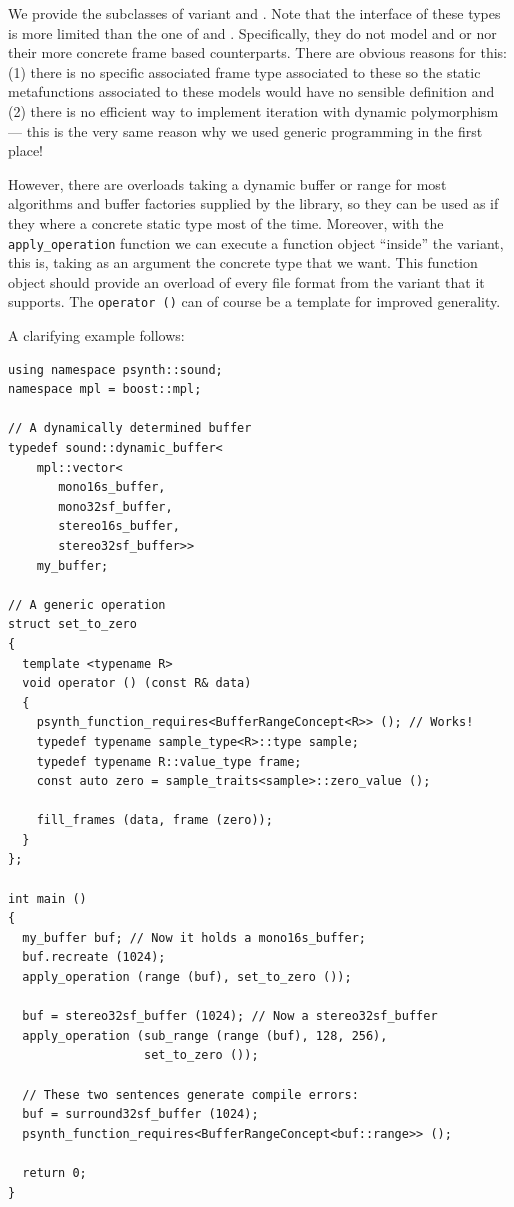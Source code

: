 We provide the subclasses of variant  and
. Note that the interface of these types
is more limited than the one of  and
. Specifically, they do not model
 and  or nor
their more concrete frame based counterparts. There
are obvious reasons for this: (1) there is no specific associated
frame type associated to these so the static metafunctions associated
to these models would have no sensible definition and (2) there is no
efficient way to implement iteration with dynamic polymorphism ---
this is the very same reason why we used generic programming in the
first place!

However, there are overloads taking a dynamic buffer or range for most
algorithms and buffer factories supplied by the library, so they can
be used as if they where a concrete static type most of the
time. Moreover, with the \texttt{apply\_operation} function we can
execute a function object ``inside'' the variant, this is, taking as
an argument the concrete type that we want. This function object
should provide an  overload of every file format from
the variant that it supports. The \texttt{operator ()} can of course
be a template for improved generality.

A clarifying example follows:

\begin{lstlisting}
using namespace psynth::sound;
namespace mpl = boost::mpl;

// A dynamically determined buffer
typedef sound::dynamic_buffer<
    mpl::vector<
       mono16s_buffer,
       mono32sf_buffer,
       stereo16s_buffer,
       stereo32sf_buffer>>
    my_buffer;

// A generic operation
struct set_to_zero
{
  template <typename R>
  void operator () (const R& data)
  {
    psynth_function_requires<BufferRangeConcept<R>> (); // Works!
    typedef typename sample_type<R>::type sample;
    typedef typename R::value_type frame;
    const auto zero = sample_traits<sample>::zero_value ();
  
    fill_frames (data, frame (zero));
  }
};

int main ()
{
  my_buffer buf; // Now it holds a mono16s_buffer;
  buf.recreate (1024);
  apply_operation (range (buf), set_to_zero ());
  
  buf = stereo32sf_buffer (1024); // Now a stereo32sf_buffer
  apply_operation (sub_range (range (buf), 128, 256), 
                   set_to_zero ());
  
  // These two sentences generate compile errors:
  buf = surround32sf_buffer (1024);
  psynth_function_requires<BufferRangeConcept<buf::range>> ();
  
  return 0;
}
\end{lstlisting}

